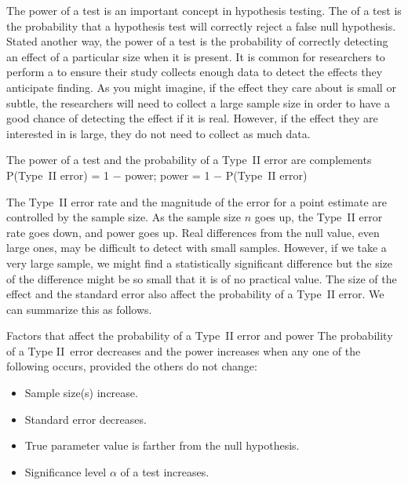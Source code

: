 

The power of a test is an important concept in hypothesis testing.  The  of a test is the probability that a hypothesis test will correctly reject a false null hypothesis.  Stated another way, the power of a test is the probability of correctly detecting an effect of a particular size when it is present.  It is common for researchers to perform a  to ensure their study collects enough data to detect the effects they anticipate finding. As you might imagine, if the effect they care about is small or subtle, the researchers will need to collect a large sample size in order to have a good chance of detecting the effect if it is real. However, if the effect they are interested in is large, they do not need to collect as much data.


\begin{onebox}{The power of a  test and the probability of a Type~II error are complements }
P(Type~II error) = 1 $-$ power; \quad power = 1 $-$ P(Type~II error)
\end{onebox}

The Type~II error rate and the magnitude of the error for a point estimate are controlled by the sample size. As the sample size $n$ goes up, the Type~II error rate goes down, and power goes up. Real differences from the null value, even large ones, may be difficult to detect with small samples. However, if we take a very large sample, we might find a statistically significant difference but the size of the difference might be so small that it is of no practical value.  The size of the effect and the standard error also affect the probability of a Type~II error.  We can summarize this as follows.

\begin{onebox}{Factors that affect the probability of a Type~II error and power}
The probability of a Type II~error decreases and the power increases
when any one of the following occurs, provided the others do not change:
\begin{itemize}\vspace{-1mm}
\setlength{\itemsep}{0mm}
\item[i. ] Sample size(s) increase.
\item[ii. ] Standard error decreases.
\item[iii. ] True parameter value is farther from the null hypothesis.
\item[iv. ] Significance level $\alpha$ of a test increases.  
\end{itemize}
\end{onebox}


